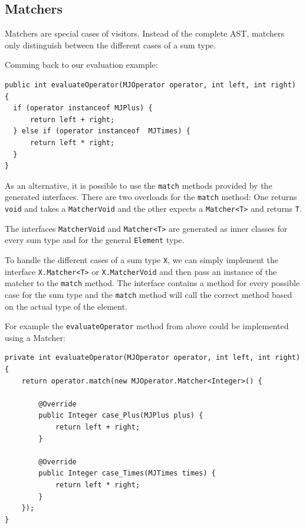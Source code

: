 \documentclass{scrartcl}
\begin{document}
\subsection{Matchers}
\label{Matchers}

Matchers are special cases of visitors.
Instead of the complete AST, matchers only distinguish between the different cases of a sum type.

Comming back to our evaluation example:
\begin{lstlisting}
public int evaluateOperator(MJOperator operator, int left, int right) {
  if (operator instanceof MJPlus) {
      return left + right;
  } else if (operator instanceof  MJTimes) {
      return left * right;
  }
}
\end{lstlisting}

As an alternative, it is possible to use the \lstinline!match! methods provided by the generated interfaces.
There are two overloads for the \lstinline!match! method: One returns \lstinline!void! and takes a \lstinline!MatcherVoid! and the other expects a \lstinline!Matcher<T>! and returns \lstinline!T!.

The interfaces \lstinline!MatcherVoid! and \lstinline!Matcher<T>! are generated as inner classes for every sum type and for the general \lstinline!Element! type.

To handle the different cases of a sum type \lstinline!X!, we can simply implement the interface \lstinline!X.Matcher<T>! or \lstinline!X.MatcherVoid! and then pass an instance of the matcher to the \lstinline!match! method.
The interface contains a method for every possible case for the sum type and the \lstinline!match! method will call the correct method based on the actual type of the element.

For example the \lstinline!evaluateOperator! method from above could be implemented using a Matcher:

\begin{lstlisting}
private int evaluateOperator(MJOperator operator, int left, int right) {
    return operator.match(new MJOperator.Matcher<Integer>() {

        @Override
        public Integer case_Plus(MJPlus plus) {
            return left + right;
        }

        @Override
        public Integer case_Times(MJTimes times) {
            return left * right;
        }
    });
}
\end{lstlisting}
\end{document}
